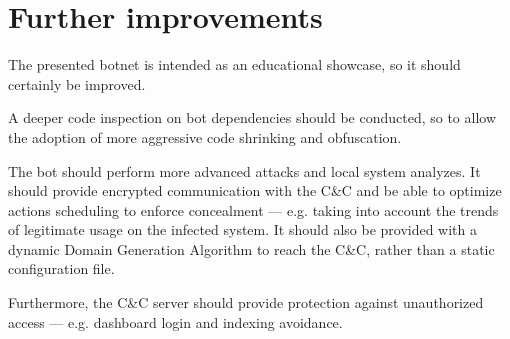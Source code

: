 \section{Further improvements}
\label{sec:further-improvements}

The presented botnet is intended as an educational showcase, so it should certainly be improved.

A deeper code inspection on bot dependencies should be conducted, so to allow the adoption of more aggressive code shrinking and obfuscation.

The bot should perform more advanced attacks and local system analyzes.
It should provide encrypted communication with the C\&C and be able to optimize actions scheduling to enforce concealment — e.g. taking into account the trends of legitimate usage on the infected system.
It should also be provided with a dynamic Domain Generation Algorithm to reach the C\&C, rather than a static configuration file.

Furthermore, the C\&C server should provide protection against unauthorized access — e.g. dashboard login and indexing avoidance.

